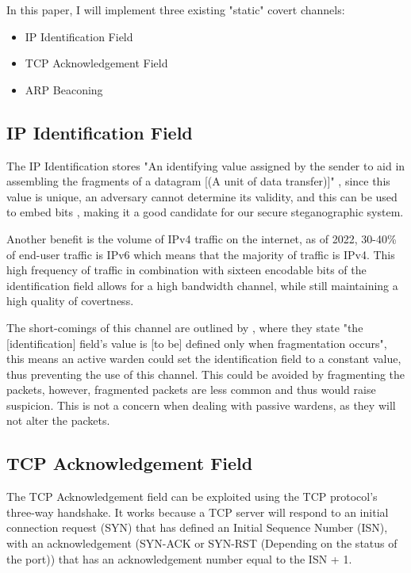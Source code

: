 In this paper, I will implement three existing "static" covert channels:

\begin{itemize}
    \item IP Identification Field
    \item TCP Acknowledgement Field
    \item ARP Beaconing
\end{itemize}

\subsection{IP Identification Field}

The IP Identification stores "An identifying value assigned by the sender to aid in assembling the fragments of a datagram [(A unit of data transfer)]" \citep{rfc791}, since this value is unique, an adversary cannot determine its validity, and this can be used to embed bits \citep{EoIICCA}, making it a good candidate for our secure steganographic system.

Another benefit is the volume of IPv4 traffic on the internet, as of 2022, 30-40\% of end-user traffic is IPv6 \citep{I10YO} which means that the majority of traffic is IPv4. This high frequency of traffic in combination with sixteen encodable bits of the identification field allows for a high bandwidth channel, while still maintaining a high quality of covertness.

The short-comings of this channel are outlined by \cite{rfc6864}, where they state "the [identification] field's value is [to be] defined only when fragmentation occurs", this means an active warden could set the identification field to a constant value, thus preventing the use of this channel. This could be avoided by fragmenting the packets, however, fragmented packets are less common and thus would raise suspicion. This is not a concern when dealing with passive wardens, as they will not alter the packets.

\subsection{TCP Acknowledgement Field}

The TCP Acknowledgement field can be exploited using the TCP protocol's three-way handshake. It works because a TCP server will respond to an initial connection request (SYN) that has defined an Initial Sequence Number (ISN), with an acknowledgement (SYN-ACK or SYN-RST (Depending on the status of the port)) that has an acknowledgement number equal to the ISN + 1.

